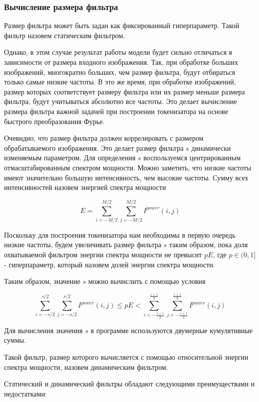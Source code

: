 \subsubsection{Вычисление размера фильтра}
Размер фильтра может быть задан как фиксированный гиперпараметр. Такой фильтр назовем статическим фильтром.

Однако, в этом случае результат работы модели будет сильно отличаться в зависимости от размера входного изображения. Так, при обработке больших изображений, многократно больших, чем размер фильтра, будут отбираться только самые низкие частоты. В это же время, при обработке изображений, размер которых соответствует размеру фильтра или их размер меньше размера фильтра, будут учитываться абсолютно все частоты. Это делает вычисление размера фильтра важной задачей при построении токенизатора на основе быстрого преобразования Фурье.

Очевидно, что размер фильтра должен коррелировать с размером обрабатываемого изображения. Это делает размер фильтра $s$ динамически изменяемым параметром. Для определения $s$ воспользуемся центрированным отмасштабированным спектром мощности. Можно заметить, что низкие частоты имеют значительно большую интенсивность, чем высокие частоты. Сумму всех интенсивностей назовем энергией спектра мощности 

$$
E = \sum\limits_{i=-M/2}^{M/2}\sum\limits_{j=-M/2}^{M/2} I^{power}(i, j)
$$ 

Поскольку для построения токенизатора нам необходимы в первую очередь низкие частоты, будем увеличивать размер фильтра $s$ таким образом, пока доля охватываемой фильтром энергии спектра мощности не превысит $pE$, где $p \in (0, 1]$ - гиперпараметр, который назовем долей энергии спектра мощности.

Таким образом, значение $s$ можно вычислить с помощью условия

$$
\sum_{i=-s/2}^{s/2}\sum_{j=-s/2}^{s/2} I^{power}(i, j) \leq pE < \sum_{i=-\frac{s+1}{2}}^{\frac{s+1}{2}}\sum_{j=-\frac{s+1}{2}}^{\frac{s+1}{2}} I^{power}(i, j)
$$

Для вычисления значения $s$ в программе используются двумерные кумулятивные суммы.

Такой фильтр, размер которого вычисляется с помощью относительной энергии спектра мощности, назовем динамическим фильтром. 

Статический и динамический фильтры обладают следующими преимуществами и недостатками:

